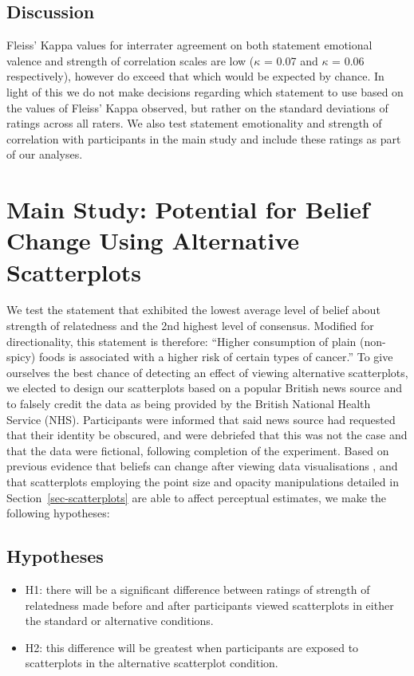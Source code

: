 \documentclass[manuscript,screen,review,anonymous]{acmart}
\providecommand{\tightlist}{%
  \setlength{\itemsep}{0pt}\setlength{\parskip}{0pt}}\usepackage{longtable,booktabs,array}
\begin{document}
\subsection{Discussion}\label{sec-discussion-pre}

Fleiss' Kappa values for interrater agreement on both statement
emotional valence and strength of correlation scales are low (\(\kappa\)
= 0.07 and \(\kappa\) = 0.06 respectively), however do exceed that which
would be expected by chance. In light of this we do not make decisions
regarding which statement to use based on the values of Fleiss' Kappa
observed, but rather on the standard deviations of ratings across all
raters. We also test statement emotionality and strength of correlation
with participants in the main study and include these ratings as part of
our analyses.

\section{Main Study: Potential for Belief Change Using Alternative
Scatterplots}\label{sec-main-study}

We test the statement that exhibited the lowest average level of belief
about strength of relatedness and the 2nd highest level of consensus.
Modified for directionality, this statement is therefore: ``Higher
consumption of plain (non-spicy) foods is associated with a higher risk
of certain types of cancer.'' To give ourselves the best chance of
detecting an effect of viewing alternative scatterplots, we elected to
design our scatterplots based on a popular British news source and to
falsely credit the data as being provided by the British National Health
Service (NHS). Participants were informed that said news source had
requested that their identity be obscured, and were debriefed that this
was not the case and that the data were fictional, following completion
of the experiment. Based on previous evidence that beliefs can change
after viewing data visualisations \citep{karduni_2020, markant_2023},
and that scatterplots employing the point size and opacity manipulations
detailed in Section~\ref{sec-scatterplots} are able to affect perceptual
estimates, we make the following hypotheses:

\subsection{Hypotheses}\label{hypotheses}

\begin{itemize}
\tightlist
\item
  H1: there will be a significant difference between ratings of strength
  of relatedness made before and after participants viewed scatterplots
  in either the standard or alternative conditions.
\item
  H2: this difference will be greatest when participants are exposed to
  scatterplots in the alternative scatterplot condition.
\end{itemize}
\end{document}
